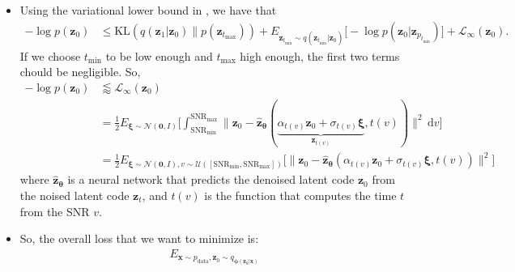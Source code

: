 \documentclass[10pt]{article}
\newcommand{\dee}{\mathrm{d}}
\newcommand{\ve}[1]{\mathbf{#1}}
\newcommand{\ves}[1]{\boldsymbol{#1}}
\newcommand{\mrm}[1]{\mathrm{#1}}
\newcommand{\mcal}[1]{\mathcal{#1}}
\newcommand{\data}{\mathrm{data}}
\begin{document}
\begin{itemize}
  \item Using the variational lower bound in \cite{KhungurnVDM}, we have that
  \begin{align*}
    -\log p(\ve{z}_0) 
    &\leq \mrm{KL}(q(\ve{z}_1|\ve{z}_0)\| p(\ve{z}_{t_{\max}})) + E_{\ve{z}_{t_{\min}} \sim q(\ve{z}_{t_{\min}}|\ve{z}_0)} \big[-\log p(\ve{z}_0|\ve{z}_{p_{t_{\min}}})\big] + \mcal{L}_{\infty}(\ve{z}_0).
  \end{align*}
  If we choose $t_{\min}$ to be low enough and $t_{\max}$ high enough, the first two terms chould be negligible. So,
  \begin{align*}
    -\log p(\ve{z}_0) 
    &\lessapprox \mcal{L}_{\infty}(\ve{z}_0) \\
    &= \frac{1}{2} E_{\ves{\xi} \sim \mcal{N}(\ve{0}, I)} \bigg[ \int_{\mrm{SNR}_{\min}}^{\mrm{SNR}_{\max}} \| \ve{z}_0 - \hat{\ve{z}}_{\ves{\theta}}(
      \underbrace{\alpha_{t(v)}\ve{z}_0 + \sigma_{t(v)} \ves{\xi}}_{\ve{z}_{t(v)}}
      , t(v)) 
    \big\|^2  \, \dee v \bigg] \\
    &= \frac{1}{2} E_{\ves{\xi} \sim \mcal{N}(\ve{0}, I), v \sim \mcal{U}([\mrm{SNR}_{\min}, \mrm{SNR}_{\max}])} \Big[ \big\|
    \ve{z}_0 - \hat{\ve{z}}_{\ves{\theta}}(
      \alpha_{t(v)}\ve{z}_0 + \sigma_{t(v)} \ves{\xi}, t(v))
    \big\|^2 \Big]
  \end{align*}
  where $\hat{\ve{z}}_{\ves{\theta}}$ is a neural network that predicts the denoised latent code $\ve{z}_0$ from the noised latent code $\ve{z}_t$, and $t(v)$ is the function that computes the time $t$ from the SNR $v$.

  \item So, the overall loss that we want to minimize is:
  \begin{align*}
    E_{\ve{x} \sim p_{\data}, \ve{z}_0 \sim q_{\ves{\phi}(\ve{z}_0|\ve{x})}}
  \end{align*}
\end{itemize}


  
\end{document}
